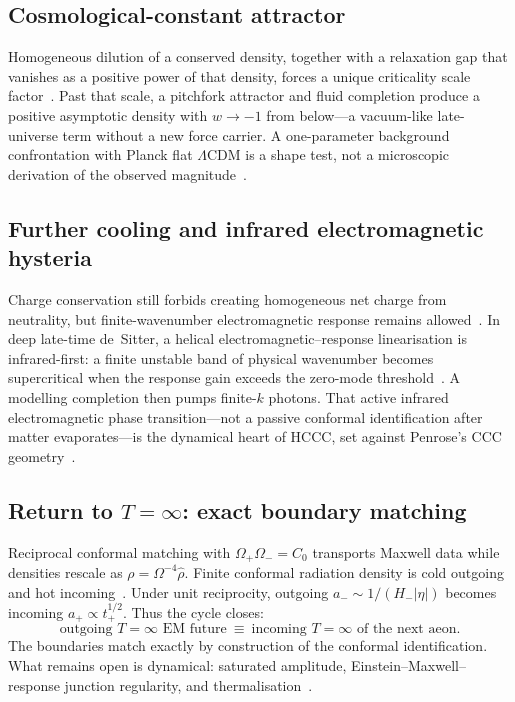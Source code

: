 \documentclass[11pt]{article}
\begin{document}
\subsection{Cosmological-constant attractor}
Homogeneous dilution of a conserved density, together with a relaxation gap that
vanishes as a positive power of that density, forces a unique criticality scale
factor~\cite{boyd2026late}.
Past that scale, a pitchfork attractor and fluid completion produce a positive
asymptotic density with $w\to-1$ from below---a vacuum-like late-universe term
without a new force carrier.
A one-parameter background confrontation with Planck flat $\Lambda$CDM is a shape
test, not a microscopic derivation of the observed magnitude~\cite{boyd2026late,Planck2018}.

\subsection{Further cooling and infrared electromagnetic hysteria}
Charge conservation still forbids creating homogeneous net charge from
neutrality, but finite-wavenumber electromagnetic response remains
allowed~\cite{boyd2026late,boyd2026ccc}.
In deep late-time de~Sitter, a helical electromagnetic--response linearisation is
infrared-first: a finite unstable band of physical wavenumber becomes supercritical
when the response gain exceeds the zero-mode threshold~\cite{boyd2026ccc}.
A modelling completion then pumps finite-$k$ photons.
That active infrared electromagnetic phase transition---not a passive conformal
identification after matter evaporates---is the dynamical heart of HCCC, set against
Penrose's CCC geometry~\cite{boyd2026ccc,Penrose2010,Penrose2013CCC}.

\subsection{\texorpdfstring{Return to $T=\infty$: exact boundary matching}{Return to infinity: exact boundary matching}}
Reciprocal conformal matching with $\Omega_+\Omega_-=C_0$ transports Maxwell data
while densities rescale as $\rho=\Omega^{-4}\hat\rho$.
Finite conformal radiation density is cold outgoing and hot
incoming~\cite{boyd2026ccc}.
Under unit reciprocity, outgoing $a_-\sim 1/(H_-|\eta|)$ becomes incoming
$a_+\propto t_+^{1/2}$.
Thus the cycle closes:
\begin{equation}
\label{eq:match}
\boxed{\text{outgoing }T=\infty\text{ EM future}\ \equiv\ \text{incoming }T=\infty\text{ of the next aeon}.}
\end{equation}
The boundaries match exactly by construction of the conformal identification.
What remains open is dynamical: saturated amplitude, Einstein--Maxwell--response
junction regularity, and thermalisation~\cite{boyd2026ccc}.
\end{document}
